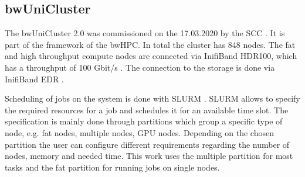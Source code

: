 \subsection{bwUniCluster}
\label{subsec:bw_uni_cluster}
The bwUniCluster 2.0 was commissioned on the 17.03.2020 by the \gls{SCC} \cite{haefner_kit_2020}.
It is part of the framework of the \gls{bwHPC}. In total the cluster has 848 nodes.
The fat and high throughput compute nodes are connected via InifiBand HDR100, which has a throughput of 100 Gbit/s \cite{haefner_kit_2020}.
The connection to the storage is done via InifiBand EDR \cite{haefner_kit_2020}.

Scheduling of jobs on the system is done with \gls{SLURM} \cite{yoo_slurm_2003}.
\gls{SLURM} allows to specify the required resources for a job and schedules it for an available time slot.
The specification is mainly done through partitions which group a specific type of node, e.g. fat nodes, multiple nodes, \gls{GPU} nodes.
Depending on the chosen partition the user can configure different requirements regarding the number of nodes, memory and needed time.
This work uses the multiple partition for most tasks and the fat partition for running jobs on single nodes.
